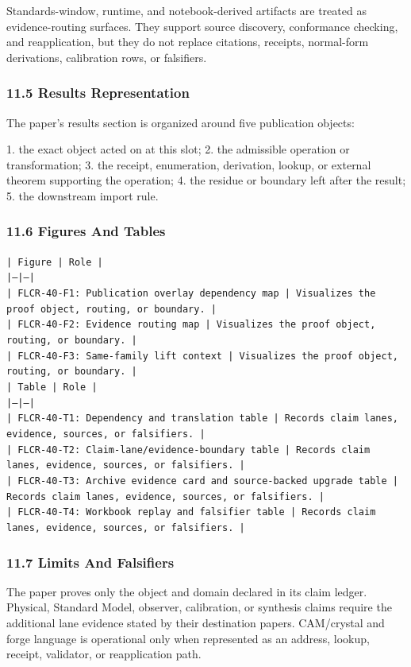 \documentclass[11pt]{article}
\begin{document}
Standards-window, runtime, and notebook-derived artifacts are treated
as evidence-routing surfaces. They support source discovery, conformance
checking, and reapplication, but they do not replace citations, receipts,
normal-form derivations, calibration rows, or falsifiers.

\subsubsection*{11.5 Results Representation}

The paper's results section is organized around five publication objects:

1. the exact object acted on at this slot;
2. the admissible operation or transformation;
3. the receipt, enumeration, derivation, lookup, or external theorem supporting
   the operation;
4. the residue or boundary left after the result;
5. the downstream import rule.

\subsubsection*{11.6 Figures And Tables}

\noindent\texttt{| Figure | Role |}\\
\noindent\texttt{|---|---|}\\
\noindent\texttt{| FLCR-40-F1: Publication overlay dependency map | Visualizes the proof object, routing, or boundary. |}\\
\noindent\texttt{| FLCR-40-F2: Evidence routing map | Visualizes the proof object, routing, or boundary. |}\\
\noindent\texttt{| FLCR-40-F3: Same-family lift context | Visualizes the proof object, routing, or boundary. |}\\

\noindent\texttt{| Table | Role |}\\
\noindent\texttt{|---|---|}\\
\noindent\texttt{| FLCR-40-T1: Dependency and translation table | Records claim lanes, evidence, sources, or falsifiers. |}\\
\noindent\texttt{| FLCR-40-T2: Claim-lane/evidence-boundary table | Records claim lanes, evidence, sources, or falsifiers. |}\\
\noindent\texttt{| FLCR-40-T3: Archive evidence card and source-backed upgrade table | Records claim lanes, evidence, sources, or falsifiers. |}\\
\noindent\texttt{| FLCR-40-T4: Workbook replay and falsifier table | Records claim lanes, evidence, sources, or falsifiers. |}\\

\subsubsection*{11.7 Limits And Falsifiers}

The paper proves only the object and domain declared in its claim ledger.
Physical, Standard Model, observer, calibration, or synthesis claims require
the additional lane evidence stated by their destination papers. CAM/crystal
and forge language is operational only when represented as an address, lookup,
receipt, validator, or reapplication path.
\end{document}
